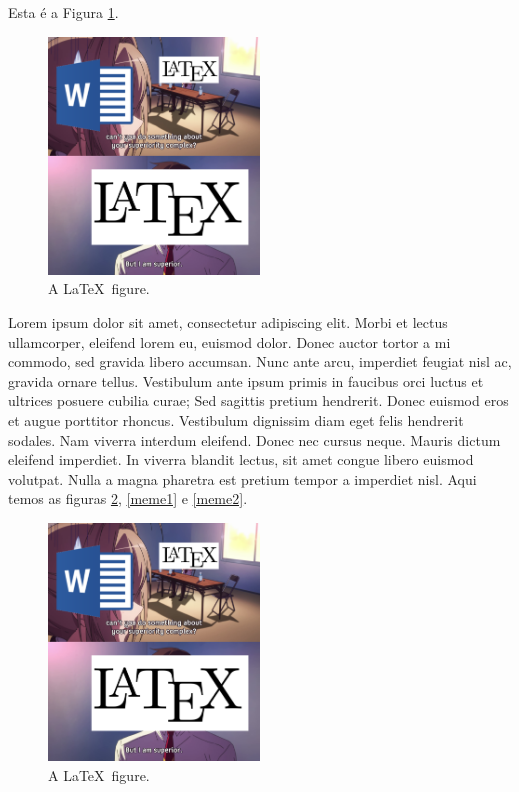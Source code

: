 \documentclass[12pt]{article}
\begin{document}
Esta é a Figura \ref{meme-1}.

\begin{figure}[!ht]
	\centering
	\includegraphics[width=0.5\textwidth]{meme_superior.png}
	\caption{A \LaTeX\ figure.}\label{meme-1}
\end{figure}

Lorem ipsum dolor sit amet, consectetur adipiscing elit. Morbi et lectus ullamcorper, eleifend lorem eu, euismod dolor. Donec auctor tortor a mi commodo, sed gravida libero accumsan. Nunc ante arcu, imperdiet feugiat nisl ac, gravida ornare tellus. Vestibulum ante ipsum primis in faucibus orci luctus et ultrices posuere cubilia curae; Sed sagittis pretium hendrerit. Donec euismod eros et augue porttitor rhoncus. Vestibulum dignissim diam eget felis hendrerit sodales. Nam viverra interdum eleifend. Donec nec cursus neque. Mauris dictum eleifend imperdiet. In viverra blandit lectus, sit amet congue libero euismod volutpat. Nulla a magna pharetra est pretium tempor a imperdiet nisl. Aqui temos as figuras \ref{meme}, \ref{meme1} e \ref{meme2}.

\begin{figure}[!ht]
	\centering
	\includegraphics[width=0.5\textwidth]{meme_superior.png}
	\caption{A \LaTeX\ figure.}\label{meme}
\end{figure}
\end{document}
